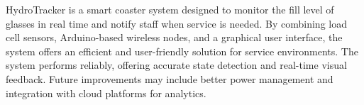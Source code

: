 HydroTracker is a smart coaster system designed to monitor the fill level of glasses in real time and notify staff when service is needed. By combining load cell sensors, Arduino-based wireless nodes, and a graphical user interface, the system offers an efficient and user-friendly solution for service environments.
The system performs reliably, offering accurate state detection and real-time visual feedback. Future improvements may include better power management and integration with cloud platforms for analytics.